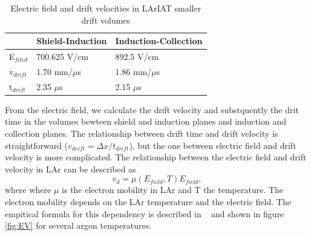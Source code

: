  
\begin{table}[]
\centering
\caption{Electric field and drift velocities in LArIAT smaller drift volumes}
\label{tab:Efields}
\begin{tabular}{|l|l|l|}
\hline
& Shield-Induction & Induction-Collection \\ \hline
E$_{filed}$ &                 700.625 V/cm        &                892.5  V/cm             \\ \hline
v$_{drift}$ &                   1.70  mm/$\mu$s   &                  1.86 mm/$\mu$s        \\ \hline
t$_{drift}$ &                   2.35  $\mu$s      &                   2.15 $\mu$s           \\ \hline

\end{tabular}
\end{table}

From the electric field, we calculate the drift velocity and substquently the drit time in the volumes bewteen shield and induction planes and induction and collection planes.
The relationship between drift time and drift velocity is straightforward ($v_{drift} = \Delta x/t_{drift}$), but the one between  electric field and drift velocity is more complicated. The relationship between the electric field and drift velocity in LAr can be described as 
\begin{equation} v_{d} = \mu(E_{field},T) E_{field}, \label{eq:vd}
\end{equation}
where where $\mu$ is the electron mobility in LAr and T the temperature. The electron mobility depends on the LAr temperature and the electric field. The empitical formula for this dependency is described in ~\cite{WWW} and shown in figure \ref{fig:EV} for several argon temperatures.



